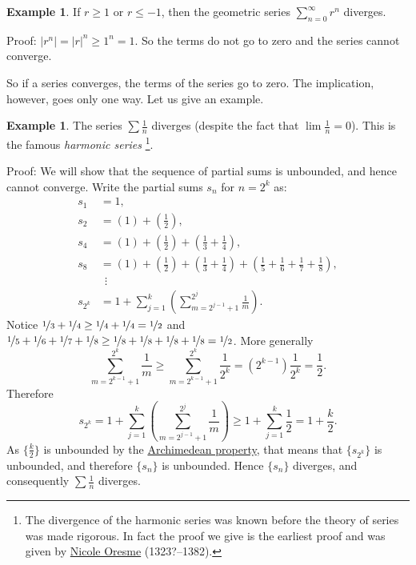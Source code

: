 \documentclass[12pt]{book}
\newcommand{\abs}[1]{\left\lvert {#1} \right\rvert}
\newcommand{\myindex}[1]{#1\index{#1}}
\theoremstyle{plain}
\theoremstyle{remark}
\theoremstyle{definition}
\theoremstyle{exercise}
\theoremstyle{example}
\newtheorem{example}[thm]{Example}
\begin{document}
\begin{example}
If $r \geq 1$ or $r \leq -1$, then the geometric series $\sum_{n=0}^\infty r^n$
diverges.

Proof: $\abs{r^n} = \abs{r}^n \geq 1^n = 1$.  So the terms do not go to zero
and the series cannot converge.
\end{example}

So if a series converges, the terms of the series go to zero.
The implication, however, goes only one way.
Let us give an example.

\begin{example} \label{example:harmonicseries}
The series $\sum \frac{1}{n}$ diverges (despite the fact that $\lim
\frac{1}{n} = 0$).  This is the famous \emph{\myindex{harmonic series}}%
\footnote{The divergence of the harmonic series was known 
before the theory of series was made rigorous.  In fact the proof we
give is the earliest proof and was given by
\href{http://en.wikipedia.org/wiki/Oresme}{Nicole Oresme}
(1323?--1382).}.

Proof: We will show that the sequence of partial sums is unbounded, and hence
cannot converge.
Write the partial sums $s_n$ for $n = 2^k$ as:
\begin{align*}
 s_1 & = 1 , \\
 s_2 & = \left( 1 \right) + \left( \frac{1}{2} \right) , \\
 s_4 & = \left( 1 \right) + \left( \frac{1}{2} \right) +
        \left( \frac{1}{3} + \frac{1}{4} \right) , \\
 s_8 & = \left( 1 \right) + \left( \frac{1}{2} \right) +
        \left( \frac{1}{3} + \frac{1}{4} \right) +
        \left( \frac{1}{5} + \frac{1}{6} + \frac{1}{7} + \frac{1}{8} \right) , \\
& ~~ \vdots \\
 s_{2^k} & = 
1 + 
\sum_{j=1}^k
\left(
\sum_{m=2^{j-1}+1}^{2^j} \frac{1}{m}
\right) .
\end{align*}
Notice $\nicefrac{1}{3} + \nicefrac{1}{4} \geq \nicefrac{1}{4} + \nicefrac{1}{4} =
\nicefrac{1}{2}$ and
$\nicefrac{1}{5} + \nicefrac{1}{6} + \nicefrac{1}{7} + \nicefrac{1}{8}
\geq \nicefrac{1}{8} + \nicefrac{1}{8} + \nicefrac{1}{8} + \nicefrac{1}{8} =
\nicefrac{1}{2}$.  More generally
\begin{equation*}
\sum_{m=2^{k-1}+1}^{2^k} \frac{1}{m}
\geq
\sum_{m=2^{k-1}+1}^{2^k} \frac{1}{2^k}
=
(2^{k-1}) \frac{1}{2^k} = \frac{1}{2} .
\end{equation*}
Therefore
\begin{equation*}
s_{2^k} = 
1 + 
\sum_{j=1}^k
\left(
\sum_{m=2^{j-1}+1}^{2^j} \frac{1}{m}
\right) 
\geq
1 + \sum_{j=1}^k \frac{1}{2} = 1 + \frac{k}{2} .
\end{equation*}
As $\{ \frac{k}{2} \}$ is unbounded by the
\hyperref[thm:arch:i]{Archimedean property}, that means that
$\{ s_{2^k} \}$ is unbounded, and therefore $\{ s_n \}$ is unbounded.
Hence $\{ s_n \}$ diverges, and consequently $\sum \frac{1}{n}$ diverges.
\end{example}
\end{document}
